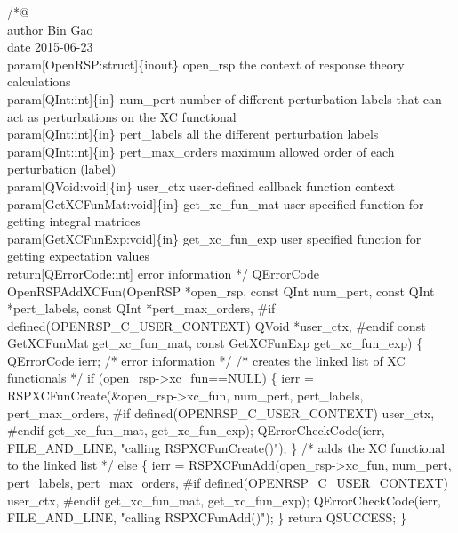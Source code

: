 /*@%
     \\author Bin Gao
     \\date 2015-06-23
     \\param[OpenRSP:struct]\{inout\} open_rsp the context of response theory calculations
     \\param[QInt:int]\{in\} num_pert number of different perturbation labels that can
         act as perturbations on the XC functional
     \\param[QInt:int]\{in\} pert_labels all the different perturbation labels
     \\param[QInt:int]\{in\} pert_max_orders maximum allowed order of each perturbation (label)
     \\param[QVoid:void]\{in\} user_ctx user-defined callback function context
     \\param[GetXCFunMat:void]\{in\} get_xc_fun_mat user specified function for
         getting integral matrices
     \\param[GetXCFunExp:void]\{in\} get_xc_fun_exp user specified function for
         getting expectation values
     \\return[QErrorCode:int] error information
*/
QErrorCode OpenRSPAddXCFun(OpenRSP *open_rsp,
                           const QInt num_pert,
                           const QInt *pert_labels,
                           const QInt *pert_max_orders,
#if defined(OPENRSP_C_USER_CONTEXT)
                           QVoid *user_ctx,
#endif
                           const GetXCFunMat get_xc_fun_mat,
                           const GetXCFunExp get_xc_fun_exp)
\{
    QErrorCode ierr;  /* error information */
    /* creates the linked list of XC functionals */
    if (open_rsp->xc_fun==NULL) \{
        ierr = RSPXCFunCreate(&open_rsp->xc_fun,
                              num_pert,
                              pert_labels,
                              pert_max_orders,
#if defined(OPENRSP_C_USER_CONTEXT)
                              user_ctx,
#endif
                              get_xc_fun_mat,
                              get_xc_fun_exp);
        QErrorCheckCode(ierr, FILE_AND_LINE, "calling RSPXCFunCreate()");
    \}
    /* adds the XC functional to the linked list */
    else \{
        ierr = RSPXCFunAdd(open_rsp->xc_fun,
                           num_pert,
                           pert_labels,
                           pert_max_orders,
#if defined(OPENRSP_C_USER_CONTEXT)
                           user_ctx,
#endif
                           get_xc_fun_mat,
                           get_xc_fun_exp);
        QErrorCheckCode(ierr, FILE_AND_LINE, "calling RSPXCFunAdd()");
    \}
    return QSUCCESS;
\}
\nwendcode{}\nwdocspar

